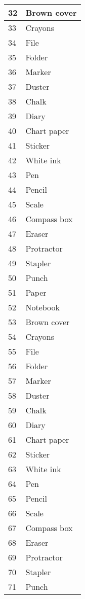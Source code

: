 \begin{longtable}{|l|l|}
		\hline
		32 & Brown cover\\
		\hline
		33 & Crayons\\
		\hline
		34 & File\\
		\hline
		35 & Folder\\
		\hline
		36 & Marker\\
		\hline
		37 & Duster\\
		\hline
		38 & Chalk\\
		\hline
		39 & Diary\\
		\hline
		40 & Chart paper\\
		\hline
		41 & Sticker\\
		\hline
		42 & White ink\\
		\hline
		43 & Pen\\
		\hline
		44 & Pencil\\
		\hline
		45 & Scale\\
		\hline
		46 & Compass box\\
		\hline
		47 & Eraser\\
		\hline
		48 & Protractor\\
		\hline
		49 & Stapler\\
		\hline
		50 & Punch\\
		\hline
		51 & Paper\\
		\hline
		52 & Notebook\\
		\hline
		53 & Brown cover\\
		\hline
		54 & Crayons\\
		\hline
		55 & File\\
		\hline
		56 & Folder\\
		\hline
		57 & Marker\\
		\hline
		58 & Duster\\
		\hline
		59 & Chalk\\
		\hline
		60 & Diary\\
		\hline
		61 & Chart paper\\
		\hline
		62 & Sticker\\
		\hline
		63 & White ink\\
		\hline
		64 & Pen\\
		\hline
		65 & Pencil\\
		\hline
		66 & Scale\\
		\hline
		67 & Compass box\\
		\hline
		68 & Eraser\\
		\hline
		69 & Protractor\\
		\hline
		70 & Stapler\\
		\hline
		71 & Punch\\

\end{longtable}
